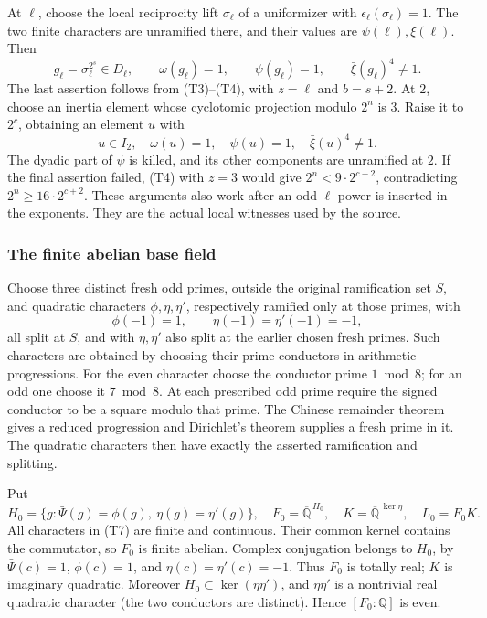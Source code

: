 At \(\ell\), choose the local reciprocity lift
\(\sigma_\ell\) of a uniformizer with
\(\epsilon_\ell(\sigma_\ell)=1\).
The two finite characters are unramified there, and
their values are \(\psi(\ell),\xi(\ell)\).
Then
\[
       g_\ell=\sigma_\ell^{2^s}\in D_\ell,\qquad
       \omega(g_\ell)=1,\qquad\psi(g_\ell)=1,\qquad
                              \bar\xi(g_\ell)^4\ne1 .
 \tag{T5}
\]
The last assertion follows from (T3)--(T4), with \(z=\ell\)
and \(b=s+2\).
At \(2\), choose an inertia element whose cyclotomic
projection modulo \(2^n\) is \(3\).
Raise it to \(2^c\), obtaining an element \(u\) with
\[
       u\in I_2,\quad \omega(u)=1,\quad\psi(u)=1,\quad
                                   \bar\xi(u)^4\ne1 .
 \tag{T6}
\]
The dyadic part of \(\psi\) is killed, and its other
components are unramified at \(2\).
If the final assertion failed, (T4) with \(z=3\) would
give \(2^n<9\cdot2^{c+2}\), contradicting
\(2^n\ge16\cdot2^{c+2}\).
These arguments also work after an odd
\(\ell\)-power is inserted in the exponents.
They are the actual local witnesses used by the source.

\subsubsection{The finite abelian base field}
Choose three distinct fresh odd primes, outside the
original ramification set \(S\), and quadratic characters
\(\phi,\eta,\eta'\), respectively ramified only at those
primes, with
\[
 \phi(-1)=1,\qquad \eta(-1)=\eta'(-1)=-1 ,
\]
all split at \(S\), and with \(\eta,\eta'\) also split
at the earlier chosen fresh primes.
Such characters are obtained by choosing their prime
conductors in arithmetic progressions.
For the even character choose the conductor prime
\(1\bmod8\); for an odd one choose it \(7\bmod8\).
At each prescribed odd prime require the signed conductor
to be a square modulo that prime.
The Chinese remainder theorem gives a reduced progression
and Dirichlet's theorem supplies a fresh prime in it.
The quadratic characters then have exactly the asserted
ramification and splitting.

Put
\[
 H_0=\{g:\bar\Psi(g)=\phi(g),\
                   \eta(g)=\eta'(g)\},\quad
 F_0=\overline{\mathbb Q}^{\,H_0},\quad
 K=\overline{\mathbb Q}^{\,\ker\eta},\quad L_0=F_0K .
 \tag{T7}
\]
All characters in (T7) are finite and continuous.
Their common kernel contains the commutator, so \(F_0\)
is finite abelian.
Complex conjugation belongs to \(H_0\), by
\(\bar\Psi(c)=1\), \(\phi(c)=1\), and
\(\eta(c)=\eta'(c)=-1\).
Thus \(F_0\) is totally real; \(K\) is imaginary quadratic.
Moreover \(H_0\subset\ker(\eta\eta')\), and
\(\eta\eta'\) is a nontrivial real quadratic character
(the two conductors are distinct).
Hence \([F_0:\mathbb Q]\) is even.

